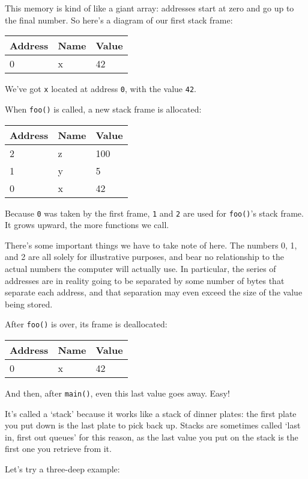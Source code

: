 \documentclass[a4paper,]{book}
\begin{document}
This memory is kind of like a giant array: addresses start at zero and
go up to the final number. So here's a diagram of our first stack frame:

\begin{longtable}[c]{@{}lll@{}}
\toprule
Address & Name & Value\tabularnewline
\midrule
\endhead
0 & x & 42\tabularnewline
\bottomrule
\end{longtable}

We've got \texttt{x} located at address \texttt{0}, with the value
\texttt{42}.

When \texttt{foo()} is called, a new stack frame is allocated:

\begin{longtable}[c]{@{}lll@{}}
\toprule
Address & Name & Value\tabularnewline
\midrule
\endhead
2 & z & 100\tabularnewline
1 & y & 5\tabularnewline
0 & x & 42\tabularnewline
\bottomrule
\end{longtable}

Because \texttt{0} was taken by the first frame, \texttt{1} and
\texttt{2} are used for \texttt{foo()}'s stack frame. It grows upward,
the more functions we call.

There's some important things we have to take note of here. The numbers
0, 1, and 2 are all solely for illustrative purposes, and bear no
relationship to the actual numbers the computer will actually use. In
particular, the series of addresses are in reality going to be separated
by some number of bytes that separate each address, and that separation
may even exceed the size of the value being stored.

After \texttt{foo()} is over, its frame is deallocated:

\begin{longtable}[c]{@{}lll@{}}
\toprule
Address & Name & Value\tabularnewline
\midrule
\endhead
0 & x & 42\tabularnewline
\bottomrule
\end{longtable}

And then, after \texttt{main()}, even this last value goes away. Easy!

It's called a `stack' because it works like a stack of dinner plates:
the first plate you put down is the last plate to pick back up. Stacks
are sometimes called `last in, first out queues' for this reason, as the
last value you put on the stack is the first one you retrieve from it.

Let's try a three-deep example:
\end{document}
